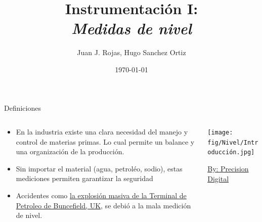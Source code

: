 \documentclass[aspectratio=169]{beamer}
\title{Instrumentación I: \\ \emph{Medidas de nivel}}
\author{
    Juan J. Rojas, Hugo Sanchez Ortiz
}
\institute{Instituto Tecnológico de Costa Rica}
\date{\today}
\begin{document}

\maketitle

\newcommand{\blackandwhite}{white} %

\begin{frame}{Definiciones}
    \begin{columns}[c, onlytextwidth]
        \begin{column}{0.45\textwidth}
            \begin{itemize}
                \item En la industria existe una clara necesidad del manejo y control de materias primas. Lo cual permite un balance y una organización de la producción.
                \item Sin importar el material (agua, petroléo, sodio), estas mediciones permiten garantizar la seguridad 
                \item Accidentes como  \href{https://www.bbc.com/news/uk-10266706}{la explosión masiva de la Terminal de Petroleo de Buncefield, UK}, se debió a la mala medición de nivel. 
            \end{itemize}
        \end{column}
        \begin{column}{0.50\textwidth}
            \texttt{[image: fig/Nivel/Introducción.jpg]}
            
            \tiny{\href{https://www.predig.com/whitepaper/level-measurement-technologies-process-control-industry}{By: Precision Digital}}
        \end{column}
    \end{columns}
\end{frame}
\end{document}
